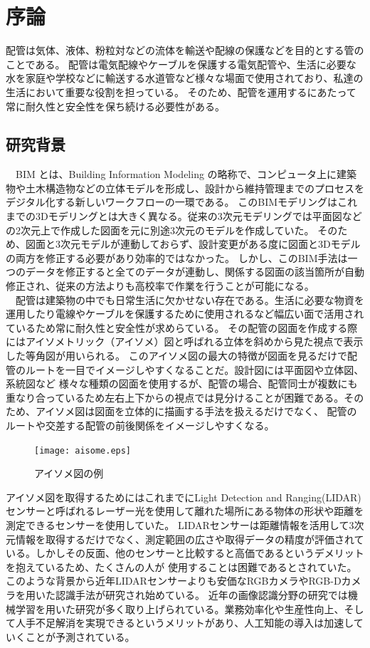 \chapter{%
序論}

配管は気体、液体、粉粒対などの流体を輸送や配線の保護などを目的とする管のことである。
配管は電気配線やケーブルを保護する電気配管や、生活に必要な水を家庭や学校などに輸送する水道管など様々な場面で使用されており、私達の生活において重要な役割を担っている。
そのため、配管を運用するにあたって常に耐久性と安全性を保ち続ける必要性がある。 \\

\section{研究背景}
　BIM とは、Building Information Modeling の略称で、コンピュータ上に建築物や土木構造物などの立体モデルを形成し、設計から維持管理までのプロセスをデジタル化する新しいワークフローの一環である。
このBIMモデリングはこれまでの3Dモデリングとは大きく異なる。従来の3次元モデリングでは平面図などの2次元上で作成した図面を元に別途3次元のモデルを作成していた。
そのため、図面と3次元モデルが連動しておらず、設計変更がある度に図面と3Dモデルの両方を修正する必要があり効率的ではなかった。
しかし、このBIM手法は一つのデータを修正すると全てのデータが連動し、関係する図面の該当箇所が自動修正され、従来の方法よりも高校率で作業を行うことが可能になる。\\
　配管は建築物の中でも日常生活に欠かせない存在である。生活に必要な物資を運用したり電線やケーブルを保護するために使用されるなど幅広い面で活用されているため常に耐久性と安全性が求めらている。
その配管の図面を作成する際にはアイソメトリック（アイソメ）図と呼ばれる立体を斜めから見た視点で表示した等角図が用いられる。
このアイソメ図の最大の特徴が図面を見るだけで配管のルートを一目でイメージしやすくなることだ。設計図には平面図や立体図、系統図など
様々な種類の図面を使用するが、配管の場合、配管同士が複数にも重なり合っているため左右上下からの視点では見分けることが困難である。そのため、アイソメ図は図面を立体的に描画する手法を扱えるだけでなく、
配管のルートや交差する配管の前後関係をイメージしやすくなる。\\
\begin{figure}[htbt]
	\centering
	 \texttt{[image: aisome.eps]}
	 \caption{アイソメ図の例}
	 \label{fig:f1}
\end{figure}

アイソメ図を取得するためにはこれまでにLight Detection and Ranging(LIDAR)センサーと呼ばれるレーザー光を使用して離れた場所にある物体の形状や距離を測定できるセンサーを使用していた。
LIDARセンサーは距離情報を活用して3次元情報を取得するだけでなく、測定範囲の広さや取得データの精度が評価されている。しかしその反面、他のセンサーと比較すると高価であるというデメリットを抱えているため、たくさんの人が
使用することは困難であるとされていた。このような背景から近年LIDARセンサーよりも安価なRGBカメラやRGB-Dカメラを用いた認識手法が研究され始めている。
近年の画像認識分野の研究では機械学習を用いた研究が多く取り上げられている。業務効率化や生産性向上、そして人手不足解消を実現できるというメリットがあり、人工知能の導入は加速していくことが予測されている。

